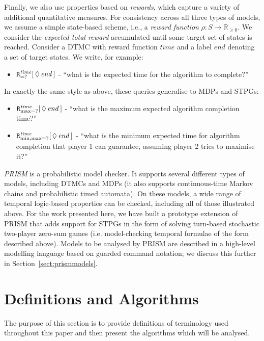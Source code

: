\documentclass{llncs}
\def\Rsetgeq{\mathbb{R}_{\geq 0}}
\begin{document}
Finally, we also use properties based on \emph{rewards},
which capture a variety of additional quantitative measures.
For consistency across all three types of models,
we assume a simple state-based scheme,
i.e., a \emph{reward function} $\rho:S\rightarrow\Rsetgeq$.
We consider the \emph{expected total reward} accumulated until some target set of states is reached.
Consider a DTMC with reward function $\mathit{time}$
and a label $\mathit{end}$ denoting a set of target states.
We write, for example:
\begin{itemize}
\item ${\tt R}^{\mathit{time}}_{=?}[\,\Diamond\,\mathit{end}\,]$ -
``what is the expected time for the algorithm to complete?''
\end{itemize}
In exactly the same style as above, these queries generalise to MDPs and STPGs: %
\begin{itemize}\addtolength{\itemsep}{2pt}
\item ${\tt R}^{\mathit{time}}_{\max=?}[\,\Diamond\,\mathit{end}\,]$ -
``what is the maximum expected algorithm completion time?''
\item ${\tt R}^{\mathit{time}}_{\min,\max=?}[\,\Diamond\,\mathit{end}\,]$ -
``what is the minimum expected time for algorithm completion
that player 1 can guarantee, assuming player 2 tries to maximise it?''
\end{itemize}
%
\emph{PRISM} \cite{KNP11} is a probabilistic model checker.
It supports several different types of models, including DTMCs and MDPs
(it also supports continuous-time Markov chains and probabilistic timed automata).
On these models, a wide range of temporal logic-based properties can be checked,
including all of those illustrated above.
For the work presented here, we have built a prototype extension of PRISM
that adds support for STPGs in the form of solving turn-based stochastic two-player zero-sum games (i.e. model-checking temporal formulae of the form described above).
Models to be analysed by PRISM are described in a
high-level modelling language based on guarded command notation;
we discuss this further in Section~\ref{sect:prismmodels}.
\section{Definitions and Algorithms}
The purpose of this section is to provide definitions of terminology
used throughout this paper and then present the algorithms which will be analysed.
\end{document}
